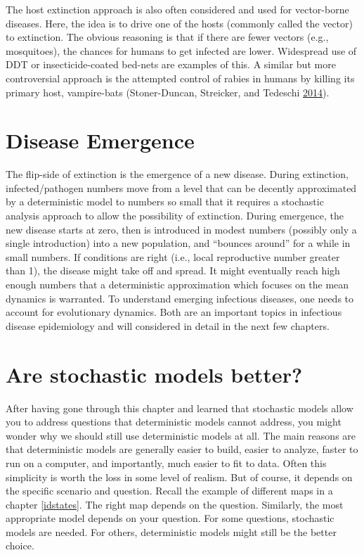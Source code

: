 \documentclass[]{book}
\theoremstyle{definition}
\theoremstyle{definition}
\theoremstyle{definition}
\theoremstyle{remark}
\begin{document}
The host extinction approach is also often considered and used for
vector-borne diseases. Here, the idea is to drive one of the hosts
(commonly called the vector) to extinction. The obvious reasoning is
that if there are fewer vectors (e.g., mosquitoes), the chances for
humans to get infected are lower. Widespread use of DDT or
insecticide-coated bed-nets are examples of this. A similar but more
controversial approach is the attempted control of rabies in humans by
killing its primary host, vampire-bats (Stoner-Duncan, Streicker, and
Tedeschi \protect\hyperlink{ref-stoner-duncan14}{2014}).

\section{Disease Emergence}\label{disease-emergence}

The flip-side of extinction is the emergence of a new disease. During
extinction, infected/pathogen numbers move from a level that can be
decently approximated by a deterministic model to numbers so small that
it requires a stochastic analysis approach to allow the possibility of
extinction. During emergence, the new disease starts at zero, then is
introduced in modest numbers (possibly only a single introduction) into
a new population, and ``bounces around'' for a while in small numbers.
If conditions are right (i.e., local reproductive number greater than
1), the disease might take off and spread. It might eventually reach
high enough numbers that a deterministic approximation which focuses on
the mean dynamics is warranted. To understand emerging infectious
diseases, one needs to account for evolutionary dynamics. Both are an
important topics in infectious disease epidemiology and will considered
in detail in the next few chapters.

\section{Are stochastic models
better?}\label{are-stochastic-models-better}

After having gone through this chapter and learned that stochastic
models allow you to address questions that deterministic models cannot
address, you might wonder why we should still use deterministic models
at all. The main reasons are that deterministic models are generally
easier to build, easier to analyze, faster to run on a computer, and
importantly, much easier to fit to data. Often this simplicity is worth
the loss in some level of realism. But of course, it depends on the
specific scenario and question. Recall the example of different maps in
a chapter \ref{idstates}. The right map depends on the question.
Similarly, the most appropriate model depends on your question. For some
questions, stochastic models are needed. For others, deterministic
models might still be the better choice.
\end{document}
